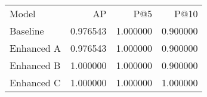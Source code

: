 \begin{tabular}{lrrr}
Model & AP & P@5 & P@10 \\
Baseline & 0.976543 & 1.000000 & 0.900000 \\
Enhanced A & 0.976543 & 1.000000 & 0.900000 \\
Enhanced B & 1.000000 & 1.000000 & 0.900000 \\
Enhanced C & 1.000000 & 1.000000 & 1.000000 \\
\end{tabular}
